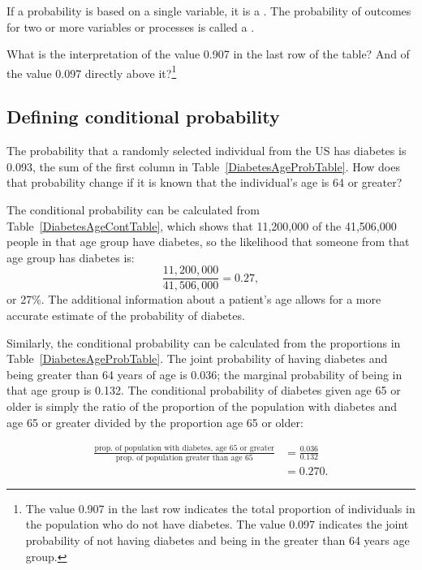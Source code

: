 \begin{termBox}{
If a probability is based on a single variable, it is a \emph{}. The probability of outcomes for two or more variables or processes is called a \emph{}.}
\end{termBox}

\begin{exercise} 
  {What is the interpretation of the value 0.907 in the last row of the table?  And of the value 0.097 directly above it?\footnote{The value 0.907 in the last row indicates the total proportion of individuals in the population who do not have diabetes. The value 0.097 indicates the joint probability of not having diabetes and being in the greater than 64 years age group.}}
\label{MarginalJointProbDiabetes}
\end{exercise}


\subsection{Defining conditional probability}


The probability that a randomly selected individual from the US has diabetes is 0.093, the sum of the first column in Table~\ref{DiabetesAgeProbTable}. How does that probability change if it is known that the individual's age is 64 or greater?  

The conditional probability can be calculated from Table~\ref{DiabetesAgeContTable}, which shows that 11,200,000 of the 41,506,000 people in that age group have diabetes, so the likelihood that someone from that age group has diabetes is:
\[  
\frac{11,200,000}{41,506,000} = 0.27,
\]
or 27\%. The additional information about a patient's age allows for a more accurate estimate of the probability of diabetes.

Similarly, the conditional probability can be calculated from the proportions in Table~\ref{DiabetesAgeProbTable}. The joint probability of having diabetes and being greater than 64 years of age is 0.036; the marginal probability of being in that age group is 0.132. The conditional probability of diabetes given age 65 or older is simply the ratio of the proportion of the population with diabetes and age 65 or greater divided by the proportion age 65 or older:

\begin{align*}
\frac{\text{prop. of population with diabetes, age 65 or greater}}{\text{prop. of population greater than age 65}} &= \frac{0.036}{0.132} \\
&= 0.270.
\end{align*}

